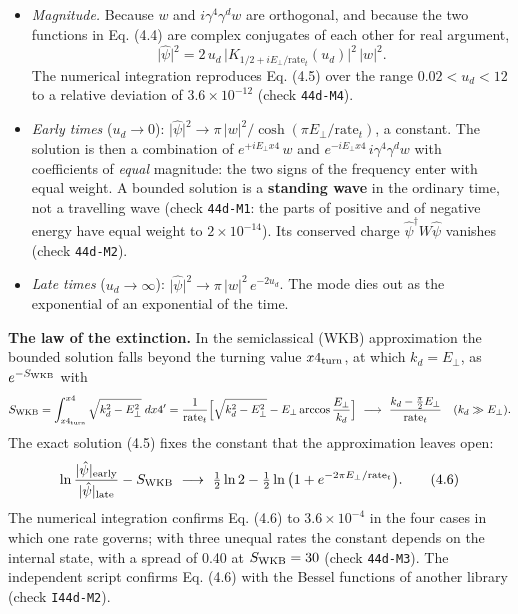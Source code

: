 \documentclass[
  10pt,
]{article}
\providecommand{\tightlist}{%
  \setlength{\itemsep}{0pt}\setlength{\parskip}{0pt}}
\begin{document}
\begin{itemize}
\tightlist
\item
  \emph{Magnitude.} Because \(w\) and \(i\gamma^4\gamma^dw\) are
  orthogonal, and because the two functions in Eq. (4.4) are complex
  conjugates of each other for real argument,
  \[\lvert\hat\psi\rvert^2=2\,u_d\,\big\lvert K_{1/2+iE_\perp/\mathrm{rate}_t}(u_d)\big\rvert^2\,\lvert w\rvert^2 .\tag{4.5}\]
  The numerical integration reproduces Eq. (4.5) over the range
  \(0.02<u_d<12\) to a relative deviation of \(3.6\times10^{-12}\)
  (check \texttt{44d-M4}).
\item
  \emph{Early times} (\(u_d\to0\)):
  \(\lvert\hat\psi\rvert^2\to\pi\,\lvert w\rvert^2/\cosh(\pi E_\perp/\mathrm{rate}_t)\),
  a constant. The solution is then a combination of
  \(e^{+iE_\perp x4}\,w\) and \(e^{-iE_\perp x4}\,i\gamma^4\gamma^dw\)
  with coefficients of \emph{equal} magnitude: the two signs of the
  frequency enter with equal weight. A bounded solution is a
  \textbf{standing wave} in the ordinary time, not a travelling wave
  (check \texttt{44d-M1}: the parts of positive and of negative energy
  have equal weight to \(2\times10^{-14}\)). Its conserved charge
  \(\hat\psi^\dagger W\hat\psi\) vanishes (check \texttt{44d-M2}).
\item
  \emph{Late times} (\(u_d\to\infty\)):
  \(\lvert\hat\psi\rvert^2\to\pi\,\lvert w\rvert^2\,e^{-2u_d}\). The
  mode dies out as the exponential of an exponential of the time.
\end{itemize}

\textbf{The law of the extinction.} In the semiclassical (WKB)
approximation the bounded solution falls beyond the turning value
\(x4_{\rm turn}\), at which \(k_d=E_\perp\), as \(e^{-S_{\rm WKB}}\)
with \[S_{\rm WKB}=\int_{x4_{\rm turn}}^{x4}\sqrt{k_d^2-E_\perp^2}\;dx4'
=\frac{1}{\mathrm{rate}_t}\Big[\sqrt{k_d^2-E_\perp^2}-E_\perp\arccos\frac{E_\perp}{k_d}\Big]
\ \longrightarrow\ \frac{k_d-\tfrac{\pi}{2}E_\perp}{\mathrm{rate}_t}\quad(k_d\gg E_\perp).\]
The exact solution (4.5) fixes the constant that the approximation
leaves open:
\[\ln\frac{\lvert\hat\psi\rvert_{\rm early}}{\lvert\hat\psi\rvert_{\rm late}}-S_{\rm WKB}
\ \longrightarrow\ \tfrac12\ln2-\tfrac12\ln\big(1+e^{-2\pi E_\perp/\mathrm{rate}_t}\big).\tag{4.6}\]
The numerical integration confirms Eq. (4.6) to \(3.6\times10^{-4}\) in
the four cases in which one rate governs; with three unequal rates the
constant depends on the internal state, with a spread of 0.40 at
\(S_{\rm WKB}=30\) (check \texttt{44d-M3}). The independent script
confirms Eq. (4.6) with the Bessel functions of another library (check
\texttt{I44d-M2}).
\end{document}
